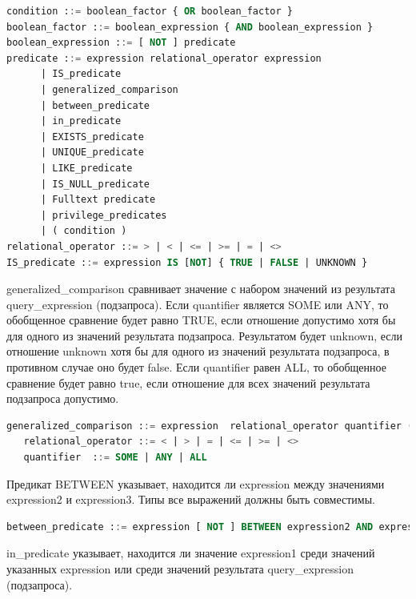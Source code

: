 \begin{lstlisting}[language=sql, label=some-code, caption=Спецификация condition]
condition ::= boolean_factor { OR boolean_factor }
boolean_factor ::= boolean_expression { AND boolean_expression }
boolean_expression ::= [ NOT ] predicate
predicate ::= expression relational_operator expression    
      | IS_predicate 
      | generalized_comparison    
      | between_predicate   
      | in_predicate
      | EXISTS_predicate
      | UNIQUE_predicate
      | LIKE_predicate 
      | IS_NULL_predicate
      | Fulltext predicate
      | privilege_predicates
      | ( condition )
relational_operator ::= > | < | <= | >= | = | <>
IS_predicate ::= expression IS [NOT] { TRUE | FALSE | UNKNOWN }
\end{lstlisting}

generalized\_comparison  сравнивает значение с набором значений из результата query\_expression (подзапроса).
Если quantifier является SOME или ANY, 
то обобщенное сравнение будет равно TRUE, если отношение 
допустимо хотя бы для одного из значений результата подзапроса.
Результатом будет unknown, если отношение unknown 
хотя бы для одного из значений результата подзапроса, в противном случае оно будет false.
Если quantifier равен ALL, то обобщенное сравнение будет равно true, 
если отношение для всех значений результата подзапроса допустимо. 

\begin{lstlisting}[language=sql, label=some-code, caption=Спецификация generalized\_comparison]
   generalized_comparison ::= expression  relational_operator quantifier ( query_expression )
   relational_operator ::= < | > | = | <= | >= | <> 
   quantifier  ::= SOME | ANY | ALL
\end{lstlisting}

Предикат BETWEEN указывает, находится ли expression между значениями expression2 и expression3. 
Типы все выражений должны быть совместимы.

\begin{lstlisting}[language=sql, label=some-code, caption=Спецификация between\_predicate]
   between_predicate ::= expression [ NOT ] BETWEEN expression2 AND expression3
\end{lstlisting}

in\_predicate указывает, находится ли значение expression1 среди значений указанных
expression или среди значений результата query\_expression (подзапроса).

